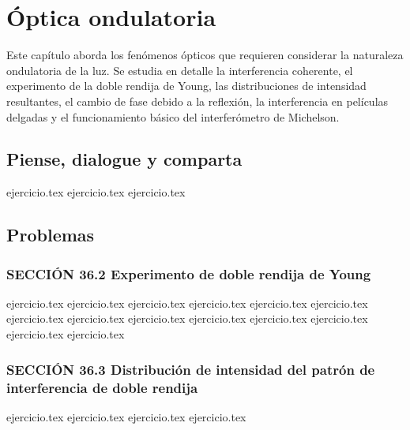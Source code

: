 \chapter{Óptica ondulatoria}
\label{cap:optica_ondulatoria}

Este capítulo aborda los fenómenos ópticos que requieren considerar la naturaleza ondulatoria de la luz. Se estudia en detalle la interferencia coherente, el experimento de la doble rendija de Young, las distribuciones de intensidad resultantes, el cambio de fase debido a la reflexión, la interferencia en películas delgadas y el funcionamiento básico del interferómetro de Michelson.

\section*{Piense, dialogue y comparta}
\begin{enumerate}
    {ejercicio.tex}
    {ejercicio.tex}
    {ejercicio.tex}
\end{enumerate}

\section*{Problemas}

\subsection*{SECCIÓN 36.2 Experimento de doble rendija de Young}
\begin{enumerate}
    {ejercicio.tex}
    {ejercicio.tex}
    {ejercicio.tex}
    {ejercicio.tex}
    {ejercicio.tex}
    {ejercicio.tex}
    {ejercicio.tex}
    {ejercicio.tex}
    {ejercicio.tex}
    {ejercicio.tex}
    {ejercicio.tex}
    {ejercicio.tex}
    {ejercicio.tex}
    {ejercicio.tex}
\end{enumerate}

\subsection*{SECCIÓN 36.3 Distribución de intensidad del patrón de interferencia de doble rendija}
\begin{enumerate}
    \setcounter{enumi}{14}
    {ejercicio.tex}
    {ejercicio.tex}
    {ejercicio.tex}
    {ejercicio.tex}
\end{enumerate}

